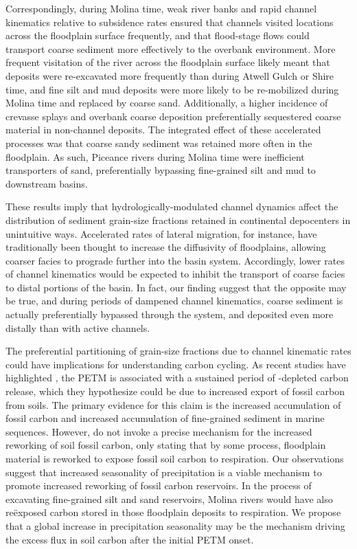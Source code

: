 \documentclass[draft]{compact_proposal}
\newcommand{\del}[3]{\ce{\delta^#1#2_{#3}}}
\begin{document}
Correspondingly, during Molina time, weak river banks and rapid channel kinematics relative to subsidence rates ensured that channels visited locations across the floodplain surface frequently, and that flood-stage flows could transport coarse sediment more effectively to the overbank environment.
More frequent visitation of the river across the floodplain surface likely meant that deposits were re-excavated more frequently than during Atwell Gulch or Shire time, and fine silt and mud deposits were more likely to be re-mobilized during Molina time and replaced by coarse sand.
Additionally, a higher incidence of crevasse splays and overbank coarse deposition preferentially sequestered coarse material in non-channel deposits.
The integrated effect of these accelerated processes was that coarse sandy sediment was retained more often in the floodplain.
As such, Piceance rivers during Molina time were inefficient transporters of sand, preferentially bypassing fine-grained silt and mud to downstream basins.

These results imply that hydrologically-modulated channel dynamics affect the distribution of sediment grain-size fractions retained in continental depocenters in unintuitive ways.
Accelerated rates of lateral migration, for instance, have traditionally been thought to increase the diffusivity of floodplains, allowing coarser facies to prograde further into the basin system.
Accordingly, lower rates of channel kinematics would be expected to inhibit the transport of coarse facies to distal portions of the basin.
In fact, our finding suggest that the opposite may be true, and during periods of dampened channel kinematics, coarse sediment is actually preferentially bypassed through the system, and deposited even more distally than with active channels.

The preferential partitioning of grain-size fractions due to channel kinematic rates could have implications for understanding carbon cycling.
As recent studies have highlighted \cnote[Lyons], the PETM is associated with a sustained period of \del{13}{C}{}-depleted carbon release, which they hypothesize could be due to increased export of fossil carbon from soils.
The primary evidence for this claim is the increased accumulation of fossil carbon and increased accumulation of fine-grained sediment in marine sequences.
However, \cnote[Lyons] do not invoke a precise mechanism for the increased reworking of soil fossil carbon, only stating that by some process, floodplain material is reworked to expose fossil soil carbon to respiration.
Our observations suggest that increased seasonality of precipitation is a viable mechanism to promote increased reworking of fossil carbon reservoirs.
In the process of excavating fine-grained silt and sand reservoirs, Molina rivers would have also re\"exposed carbon stored in those floodplain deposits to respiration.
We propose that a global increase in precipitation seasonality may be the mechanism driving the excess flux in soil carbon after the initial PETM onset.
\end{document}
